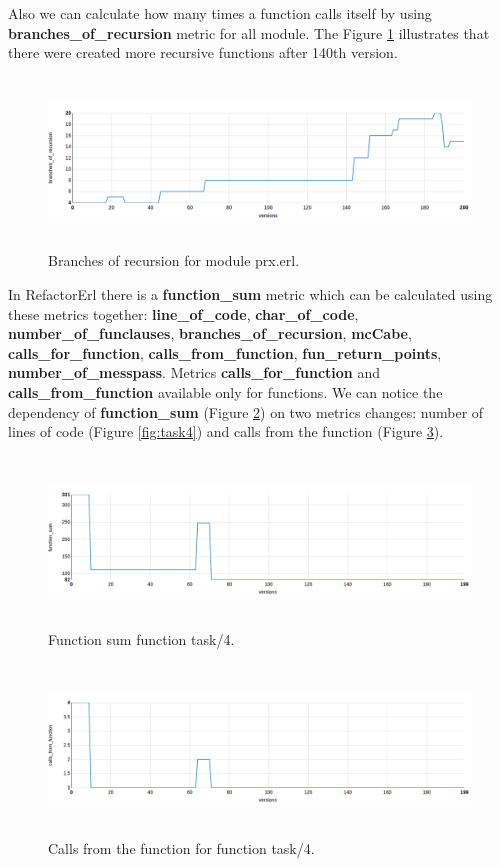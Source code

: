 Also we can calculate how many times a function calls itself by using \textbf{branches\_of\_recursion} metric for all module. The Figure \ref{fig:br} illustrates that there were created more recursive functions after 140th version.

\begin{figure}[h]
	\centering
	\includegraphics[height=45mm]{figures/br.png}
	\caption{Branches of recursion for module prx.erl.} 
	\label{fig:br}
\end{figure}

In RefactorErl there is a \textbf{function\_sum} metric which can be calculated using these metrics together: \textbf{line\_of\_code}, \textbf{char\_of\_code}, \textbf{number\_of\_funclauses}, \textbf{branches\_of\_recursion},
\textbf{mcCabe}, \textbf{calls\_for\_function}, \textbf{calls\_from\_function}, \textbf{fun\_return\_points}, \textbf{number\_of\_messpass}. Metrics \textbf{calls\_for\_function} and \textbf{calls\_from\_function} available only for functions. We can notice the dependency of \textbf{function\_sum} (Figure \ref{fig:function_sum_task4}) on two metrics changes: number of lines of code (Figure \ref{fig:task4}) and calls from the function (Figure \ref{fig:calls_from_function_task4}).

\begin{figure}[h]
	\centering
	\includegraphics[height=45mm]{figures/function_sum_task4.png}
	\caption{Function sum function task/4.} 
	\label{fig:function_sum_task4}
\end{figure}

\begin{figure}[h]
	\centering
	\includegraphics[height=45mm]{figures/calls_from_function_task4.png}
	\caption{Calls from the function for function task/4.} 
	\label{fig:calls_from_function_task4}
\end{figure}

